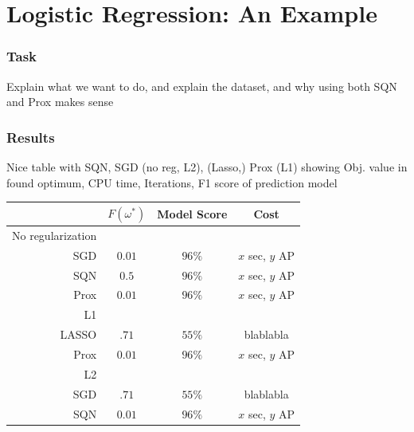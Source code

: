 \documentclass[10pt]{beamer}
\begin{document}
\section{Logistic Regression: An Example}
  \begin{frame}\frametitle{Task}
    Explain what we want to do, and explain the dataset,
    and why using both SQN and Prox makes sense   
  \end{frame}

  \begin{frame}\frametitle{Results}
    Nice table with SQN, SGD (no reg, L2), (Lasso,) Prox (L1) showing
    Obj. value in found optimum, CPU time, Iterations, F1 score of prediction model

    \begin{table}[t]
    \centering
      \begin{tabular}{r|c|c|c}
        \phantom 0 & \textbf{$F(\omega^*)$} & \textbf{Model Score} & \textbf{Cost}\\
      \hline \alert{No regularization}   &      & &  \\
        SGD   & $0.01$  & $96\%$  & $x$ sec, $y$ AP\\
        SQN   & $0.5$  & $96\%$  & $x$ sec, $y$ AP\\
        Prox   & $0.01$  & $96\%$  & $x$ sec, $y$ AP\\
      \hline \hline \alert{L1}        &    &   &  \\
      LASSO & $.71$  &  $55\%$ & blablabla \\
        Prox   & $0.01$  & $96\%$  & $x$ sec, $y$ AP\\
      \hline \hline \alert{L2}        &    &   &  \\
       SGD & $.71$  &  $55\%$ & blablabla \\
        SQN   & $0.01$  & $96\%$  & $x$ sec, $y$ AP\\
      \end{tabular}
    \end{table}
  \end{frame}
\end{document}
